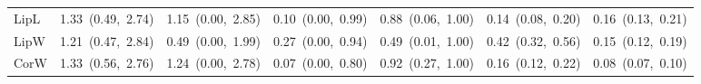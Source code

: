 \documentclass[12pt,letterpaper]{article}
\def\P{\emph{Pedicularis}}
\begin{document}
\begin{table}
\begin{tabular}{lcccccc}
LipL   &   1.33~(0.49,~2.74)  & 1.15~(0.00,~2.85)  &  0.10~(0.00,~0.99)  & 0.88~(0.06,~1.00)  & 0.14~(0.08,~0.20) & 0.16~(0.13,~0.21)    \\
LipW   &   1.21~(0.47,~2.84)  & 0.49~(0.00,~1.99)  &  0.27~(0.00,~0.94)  & 0.49~(0.01,~1.00)  & 0.42~(0.32,~0.56) & 0.15~(0.12,~0.19)    \\
CorW   &   1.33~(0.56,~2.76)  & 1.24~(0.00,~2.78)  &  0.07~(0.00,~0.80)  & 0.92~(0.27,~1.00)  & 0.16~(0.12,~0.22) & 0.08~(0.07,~0.10)    \\
\hline
\end{tabular}
\end{table}


\end{document}
